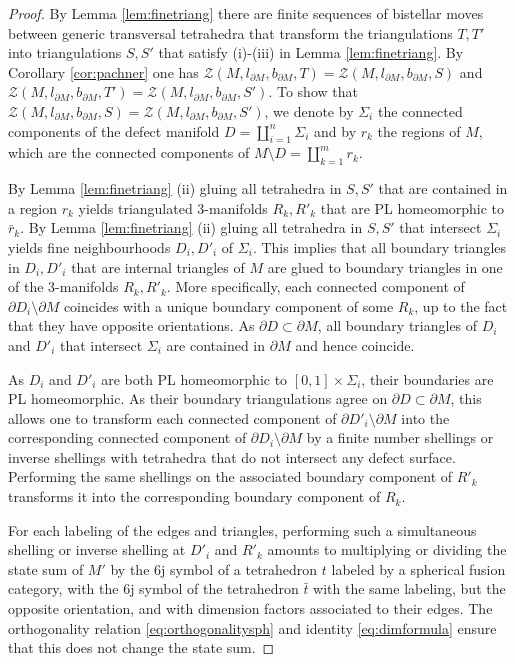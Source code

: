 \documentclass[1.5pt, a4paper]{article}
\begin{document}
\begin{proof} By Lemma \ref{lem:finetriang} there are  finite sequences of  bistellar moves  between generic  transversal  tetrahedra that transform the triangulations $T,T'$ into triangulations $S,S'$ that satisfy (i)-(iii) in Lemma \ref{lem:finetriang}. By Corollary \ref{cor:pachner} one has $\mathcal Z(M,l_{\partial M}, b_{\partial M},T)=\mathcal Z(M,l_{\partial M}, b_{\partial M},S)$ and $\mathcal Z(M,l_{\partial M}, b_{\partial M},T')=\mathcal Z(M,l_{\partial M}, b_{\partial M},S')$. 
To show that $\mathcal Z(M,l_{\partial M}, b_{\partial M},S)=\mathcal Z(M,l_{\partial M}, b_{\partial M},S')$, we
denote by $\Sigma_i$ the connected components of the defect manifold $D=\amalg_{i=1}^n \Sigma_i$ and by $r_k$ the regions of $M$, which are the connected components of $M\setminus D=\amalg_{k=1}^m r_k$.

 By Lemma \ref{lem:finetriang} (ii)  gluing all tetrahedra in $S, S'$ that are contained in a region $r_k$ yields  triangulated  3-manifolds $R_k, R'_k$ that are PL homeomorphic to $\bar r_k$.  
 By Lemma \ref{lem:finetriang} (ii) gluing all tetrahedra in $S, S'$ that intersect $\Sigma_i$ yields fine neighbourhoods $D_i, D'_i$ of $\Sigma_i$.
 This implies that all boundary triangles in $D_i, D'_i$ that are internal triangles of $M$ are glued to boundary triangles in one of the 3-manifolds $R_k, R'_k$.
 More specifically, each connected component of $\partial D_i\setminus \partial M$ coincides with a unique boundary component of  some $R_k$,  up to the fact that they have  opposite orientations. 
 As $\partial D\subset \partial M$, all boundary triangles of $D_i$ and $D'_i$ that intersect $\Sigma_i$ are contained in $\partial M$ and hence coincide. 
 
As  $D_i$ and $D'_i$ are both PL homeomorphic  to  $[0,1]\times \Sigma_i$, their boundaries are PL homeomorphic. 
As their boundary triangulations agree on $\partial D\subset \partial M$, this allows one to transform each connected component of $\partial D'_i\setminus \partial M$ into the corresponding  connected component of  $\partial D_i\setminus \partial M$ by a finite number  shellings  or inverse shellings with tetrahedra that do not intersect any defect surface. Performing the same  shellings on the associated boundary component of $R'_k$   transforms it into the corresponding boundary component of  $R_k$.

For each labeling of the edges and triangles, performing  such a simultaneous  shelling or inverse shelling at $D'_i$ and $R'_k$ amounts to multiplying or dividing the state sum of $M'$ by the 6j symbol of a  tetrahedron $t$  labeled by a spherical fusion category, with the 6j symbol of the tetrahedron $\bar t$ with the same labeling, but the opposite orientation, and with  dimension factors associated to their edges.   The orthogonality relation \eqref{eq:orthogonalitysph} and identity \eqref{eq:dimformula} ensure that  this does not change the state sum. 


\end{proof}
\end{document}

